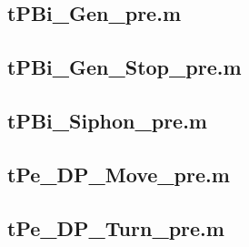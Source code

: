 \documentclass[runningheads,a4paper]{llncs}
\newcommand{\GPenSIM}{../GPenSIM}
\begin{document}
\subsection{tPBi\_Gen\_pre.m}
\label{app:tPBi_Gen_pre}


\subsection{tPBi\_Gen\_Stop\_pre.m}
\label{app:tPBi_Gen_Stop_pre}


\subsection{tPBi\_Siphon\_pre.m}
\label{app:tPBi_Siphon_pre}


\subsection{tPe\_DP\_Move\_pre.m}
\label{app:tPe_DP_Move_pre}


\subsection{tPe\_DP\_Turn\_pre.m}
\label{app:tPe_DP_Turn_pre}

\end{document}
